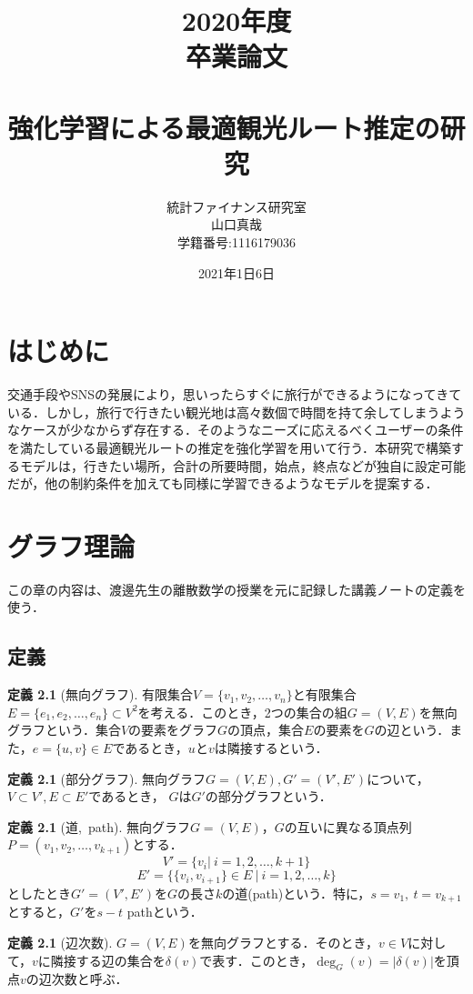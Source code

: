 \documentclass[a4paper,12pt]{jsreport}
\title{2020年度\\卒業論文\\ \  \\強化学習による最適観光ルート推定の研究}
\author{統計ファイナンス研究室\\
山口真哉\\
学籍番号:1116179036}
\date{2021年1日6日}
\theoremstyle{definition}
\newtheorem{definition}[theorem]{定義}
\begin{document}
\maketitle
\tableofcontents

\chapter{はじめに}
交通手段やSNSの発展により，思いったらすぐに旅行ができるようになってきている．しかし，旅行で行きたい観光地は高々数個で時間を持て余してしまうようなケースが少なからず存在する．そのようなニーズに応えるべくユーザーの条件を満たしている最適観光ルートの推定を強化学習を用いて行う．本研究で構築するモデルは，行きたい場所，合計の所要時間，始点，終点などが独自に設定可能だが，他の制約条件を加えても同様に学習できるようなモデルを提案する．




\chapter{グラフ理論}
この章の内容は、渡邊先生の離散数学の授業を元に記録した講義ノートの定義を使う．
\section{定義}
\begin{definition}[無向グラフ]
    有限集合$V=\{v_1,v_2,\ldots,v_n\}$と有限集合$E=\{e_1,e_2,\ldots,e_n\}\subset V^2$を考える．このとき，2つの集合の組$G=(V,E)$を無向グラフという．集合$V$の要素をグラフ$G$の頂点，集合$E$の要素を$G$の辺という．また，$e=\{u,v\}\in E$であるとき，$u$と$v$は隣接するという．
\end{definition}
\begin{definition}[部分グラフ]
    無向グラフ$G=(V,E),G'=(V',E')$について，$V\subset V',E\subset E'$であるとき， $G$は$G'$の部分グラフという．
\end{definition}
\begin{definition}[道,\ path]
    無向グラフ$G=(V,E)$，$G$の互いに異なる頂点列$P=(v_1,v_2,\ldots, v_{k+1})$とする．
    \begin{equation}
        V'=\{v_i|\ i=1,2,\ldots,k+1\}
    \end{equation}
    \begin{equation}
        E'=\{\{v_i,v_{i+1}\}\in E\ |\ i=1,2,\ldots,k\}
    \end{equation}
    としたとき$G'=(V',E')$を$G$の長さ$k$の道(path)という．特に，$s=v_1,\ t=v_{k+1}$とすると，$G'$を$s-t$ pathという．
\end{definition}
\begin{definition}[辺次数]
    $G=(V,E)$を無向グラフとする．そのとき，$v\in V$に対して，$v$に隣接する辺の集合を$\delta(v)$で表す．このとき，$\deg_G(v)=|\delta(v)|$を頂点$ v$の辺次数と呼ぶ．
\end{definition}
\end{document}
